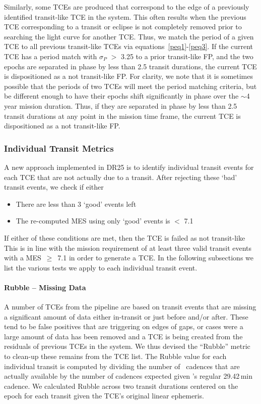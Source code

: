 Similarly, some TCEs are produced that correspond to the edge of a previously identified transit-like TCE in the system. This often results when the previous TCE corresponding to a transit or eclipse is not completely removed prior to searching the light curve for another TCE. Thus, we match the period of a given TCE to all previous transit-like TCEs via equations~\ref{peq1}-\ref{peq3}.  If the current TCE has a period match with $\sigma_{P}$ $>$ 3.25 to a prior transit-like FP, and the two epochs are separated in phase by less than 2.5 transit durations, the current TCE is dispositioned as a not transit-like FP. For clarity, we note that it is sometimes possible that the periods of two TCEs will meet the period matching criteria, but be different enough to have their epochs shift significantly in phase over the $\sim$4 year mission duration. Thus, if they are separated in phase by less than 2.5 transit durations at any point in the mission time frame, the current TCE is dispositioned as a not transit-like FP.



\subsubsection{Individual Transit Metrics}
\label{s:indivtrans}
A new approach implemented in DR25 is to identify individual transit events for each TCE that are not actually due to a transit. After rejecting these `bad' transit events, we check if either

\begin{itemize}
\item There are less than 3 `good' events left
\item The re-computed MES using only `good' events is $<$ 7.1
\end{itemize}

\noindent If either of these conditions are met, then the TCE is failed as not transit-like This is in line with the \kepler{} mission requirement of at least three valid transit events with a MES~$\ge$~7.1 in order to generate a TCE. In the following subsections we list the various tests we apply to each individual transit event.


\paragraph{Rubble -- Missing Data}

A number of TCEs from the \kepler{} pipeline are based on transit events that are missing a significant amount of data either in-transit or just before and/or after. These tend to be false positives that are triggering on edges of gaps, or cases were a large amount of data has been removed and a TCE is being created from the residuals of previous TCEs in the system. We thus devised the ``Rubble'' metric to clean-up these remains from the TCE list. The Rubble value for each individual transit is computed by dividing the number of \Kepler\ cadences that are actually available by the number of cadences expected given \Kepler's regular 29.42\,min cadence.  We calculated Rubble across two transit durations centered on the epoch for each transit given the TCE's original linear ephemeris. 


